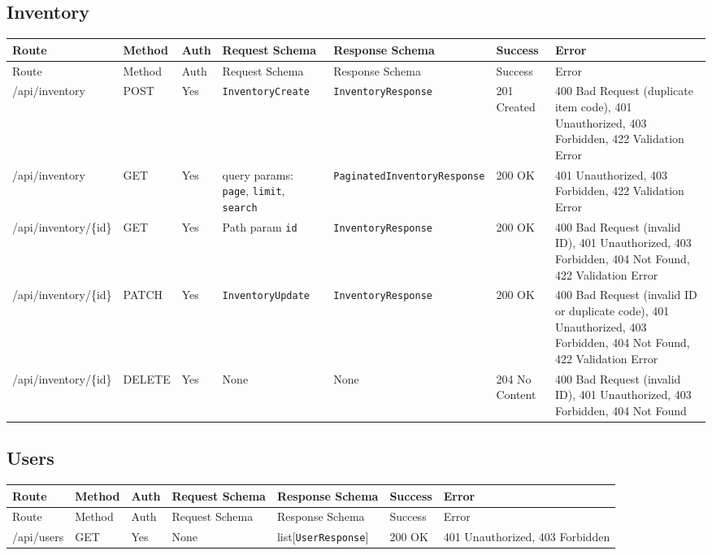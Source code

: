 \subsection{Inventory}
\begin{longtable}{p{3.2cm} p{1.7cm} p{2.2cm} p{3.6cm} p{3.6cm} p{1.8cm} p{1.8cm}}
\toprule
Route & Method & Auth & Request Schema & Response Schema & Success & Error \\
\midrule
\endfirsthead
\toprule
Route & Method & Auth & Request Schema & Response Schema & Success & Error \\
\midrule
\endhead
\bottomrule
\endfoot

/api/inventory & POST & Yes & \texttt{InventoryCreate} & \texttt{InventoryResponse} & 201 Created & 400 Bad Request (duplicate item code), 401 Unauthorized, 403 Forbidden, 422 Validation Error \\

/api/inventory & GET & Yes & query params: \texttt{page}, \texttt{limit}, \texttt{search} & \texttt{PaginatedInventoryResponse} & 200 OK & 401 Unauthorized, 403 Forbidden, 422 Validation Error \\

/api/inventory/\{id\} & GET & Yes & Path param \texttt{id} & \texttt{InventoryResponse} & 200 OK & 400 Bad Request (invalid ID), 401 Unauthorized, 403 Forbidden, 404 Not Found, 422 Validation Error \\

/api/inventory/\{id\} & PATCH & Yes & \texttt{InventoryUpdate} & \texttt{InventoryResponse} & 200 OK & 400 Bad Request (invalid ID or duplicate code), 401 Unauthorized, 403 Forbidden, 404 Not Found, 422 Validation Error \\

/api/inventory/\{id\} & DELETE & Yes & None & None & 204 No Content & 400 Bad Request (invalid ID), 401 Unauthorized, 403 Forbidden, 404 Not Found \\
\end{longtable}

\subsection{Users}
\begin{longtable}{p{3.2cm} p{1.7cm} p{2.2cm} p{3.6cm} p{3.6cm} p{1.8cm} p{1.8cm}}
\toprule
Route & Method & Auth & Request Schema & Response Schema & Success & Error \\
\midrule
\endfirsthead
\toprule
Route & Method & Auth & Request Schema & Response Schema & Success & Error \\
\midrule
\endhead
\bottomrule
\endfoot

/api/users & GET & Yes & None & list[\texttt{UserResponse}] & 200 OK & 401 Unauthorized, 403 Forbidden \\
\end{longtable}
